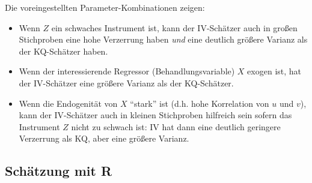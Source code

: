 \documentclass[
  a4paper,
  DIV=11,
  oneside]{scrreprt}
\newenvironment{Shaded}{\begin{snugshade}}{\end{snugshade}}
\newcommand{\AttributeTok}[1]{\textcolor[rgb]{0.40,0.45,0.13}{#1}}
\newcommand{\CommentTok}[1]{\textcolor[rgb]{0.37,0.37,0.37}{#1}}
\newcommand{\DecValTok}[1]{\textcolor[rgb]{0.68,0.00,0.00}{#1}}
\newcommand{\FloatTok}[1]{\textcolor[rgb]{0.68,0.00,0.00}{#1}}
\newcommand{\FunctionTok}[1]{\textcolor[rgb]{0.28,0.35,0.67}{#1}}
\newcommand{\NormalTok}[1]{\textcolor[rgb]{0.00,0.23,0.31}{#1}}
\newcommand{\OtherTok}[1]{\textcolor[rgb]{0.00,0.23,0.31}{#1}}
\newcommand{\SpecialCharTok}[1]{\textcolor[rgb]{0.37,0.37,0.37}{#1}}
\newcommand{\StringTok}[1]{\textcolor[rgb]{0.13,0.47,0.30}{#1}}
\begin{document}
Die voreingestellten Parameter-Kombinationen zeigen:

\begin{itemize}
\item
  Wenn \(Z\) ein schwaches Instrument ist, kann der IV-Schätzer auch in
  großen Stichproben eine hohe Verzerrung haben \emph{und} eine deutlich
  größere Varianz als der KQ-Schätzer haben.
\item
  Wenn der interessierende Regressor (Behandlungsvariable) \(X\) exogen
  ist, hat der IV-Schätzer eine größere Varianz als der KQ-Schätzer.
\item
  Wenn die Endogenität von \(X\) ``stark'' ist (d.h. hohe Korrelation
  von \(u\) und \(v\)), kann der IV-Schätzer auch in kleinen Stichproben
  hilfreich sein sofern das Instrument \(Z\) nicht zu schwach ist: IV
  hat dann eine deutlich geringere Verzerrung als KQ, aber eine größere
  Varianz.
\end{itemize}

\subsection{Schätzung mit R}\label{schuxe4tzung-mit-r-1}

\begin{Shaded}
\end{Shaded}
\end{document}
